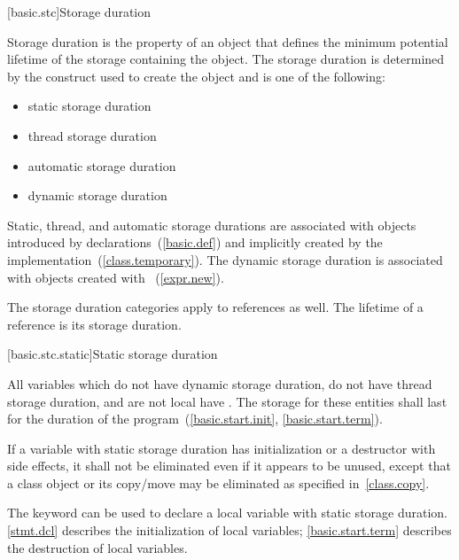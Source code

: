 [basic.stc]{Storage duration}

\pnum
{}%
Storage duration is the property of an object that defines the minimum
potential lifetime of the storage containing the object. The storage
duration is determined by the construct used to create the object and is
one of the following:

\begin{itemize}
\item static storage duration
\item thread storage duration
\item automatic storage duration
\item dynamic storage duration
\end{itemize}

\pnum
{}%
%
%
%
Static, thread, and automatic storage durations are associated with objects
introduced by declarations~(\ref{basic.def}) and implicitly created by
the implementation~(\ref{class.temporary}). The dynamic storage duration
is associated with objects created with 
~(\ref{expr.new}).

\pnum
The storage duration categories apply to references as well. The
lifetime of a reference is its storage duration.

[basic.stc.static]{Static storage duration}

\pnum
{}%
All variables which do not have dynamic storage duration, do not have thread
storage duration, and are not local
have . The
storage for these entities shall last for the duration of the
program~(\ref{basic.start.init}, \ref{basic.start.term}).

\pnum
If a variable with static storage duration has initialization or a
destructor with side effects, it shall not be eliminated even if it
appears to be unused, except that a class object or its copy/move may be
eliminated as specified in~\ref{class.copy}.

\pnum
{}%
The keyword  can be used to declare a local variable with
static storage duration. \enternote \ref{stmt.dcl} describes the
initialization of local  variables; \ref{basic.start.term}
describes the destruction of local  variables. \exitnote

